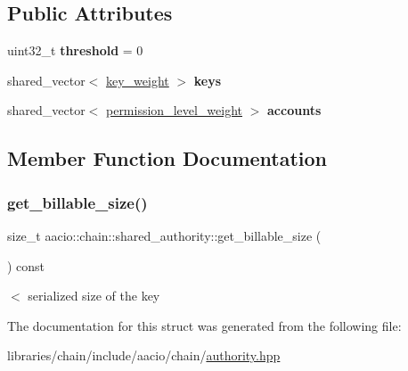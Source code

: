 \subsection*{Public Attributes}
\begin{DoxyCompactItemize}
\item 
\mbox{\label{structaacio_1_1chain_1_1shared__authority_aa07b4caed255fdd3e037dd1a16d56383}} 
uint32\+\_\+t {\bfseries threshold} = 0
\item 
\mbox{\label{structaacio_1_1chain_1_1shared__authority_ab63ccd8938cd3000807eab7254adafc4}} 
shared\+\_\+vector$<$ \mbox{\hyperlink{structaacio_1_1chain_1_1key__weight}{key\+\_\+weight}} $>$ {\bfseries keys}
\item 
\mbox{\label{structaacio_1_1chain_1_1shared__authority_a9c84d48b7b434b8e57c410731f097ecf}} 
shared\+\_\+vector$<$ \mbox{\hyperlink{structaacio_1_1chain_1_1permission__level__weight}{permission\+\_\+level\+\_\+weight}} $>$ {\bfseries accounts}
\end{DoxyCompactItemize}


\subsection{Member Function Documentation}
\mbox{\label{structaacio_1_1chain_1_1shared__authority_a3077b76ccc143ccbaf24054a71ffe9a4}} 
\subsubsection{\texorpdfstring{get\+\_\+billable\+\_\+size()}{get\_billable\_size()}}
{\footnotesize\ttfamily size\+\_\+t aacio\+::chain\+::shared\+\_\+authority\+::get\+\_\+billable\+\_\+size (\begin{DoxyParamCaption}{ }\end{DoxyParamCaption}) const\hspace{0.3cm}{\ttfamily [inline]}}

$<$ serialized size of the key 

The documentation for this struct was generated from the following file\+:\begin{DoxyCompactItemize}
\item 
libraries/chain/include/aacio/chain/\mbox{\hyperlink{authority_8hpp}{authority.\+hpp}}\end{DoxyCompactItemize}
